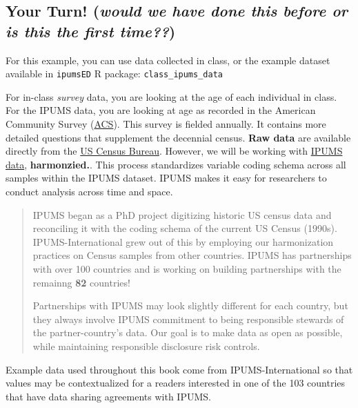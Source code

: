 \documentclass[
]{book}
\begin{document}
\hypertarget{your-turn-would-we-have-done-this-before-or-is-this-the-first-time}{%
\subsection{\texorpdfstring{Your Turn! (\emph{would we have done this before or is this the first time??})}{Your Turn! (would we have done this before or is this the first time??)}}\label{your-turn-would-we-have-done-this-before-or-is-this-the-first-time}}

For this example, you can use data collected in class, or the example dataset available in \texttt{ipumsED} R package: \texttt{class\_ipums\_data}

For in-class \emph{survey} data, you are looking at the age of each individual in class.
For the IPUMS data, you are looking at age as recorded in the American Community Survey
(\href{https://www.census.gov/programs-surveys/acs}{ACS}). This survey is fielded
annually. It contains more detailed questions that supplement the decennial census. \textbf{Raw data} are available directly from the \href{https://www.census.gov/programs-surveys/acs/data.html}{US Census Bureau}. However, we will be working with \href{https://ipums.org}{IPUMS data}, \textbf{harmonzied.}. This process standardizes variable coding schema across all samples within the IPUMS dataset. IPUMS makes it easy for researchers to conduct analysis across time and space.

\begin{quote}
IPUMS began as a PhD project digitizing historic US census data and reconciling
it with the coding schema of the current US Census (1990s). IPUMS-International grew out
of this by employing our harmonization practices on Census samples from other countries.
IPUMS has partnerships with over 100 countries and is working on building partnerships with the
remainng \textbf{82} countries!

Partnerships with IPUMS may look slightly different for each country, but they always
involve IPUMS commitment to being responsible stewards of the partner-country's data.
Our goal is to make data as open as possible, while maintaining responsible disclosure risk controls.
\end{quote}

Example data used throughout this book come from IPUMS-International so that values may be contextualized for a readers interested in one of the 103 countries that have data sharing agreements with IPUMS.
\end{document}
